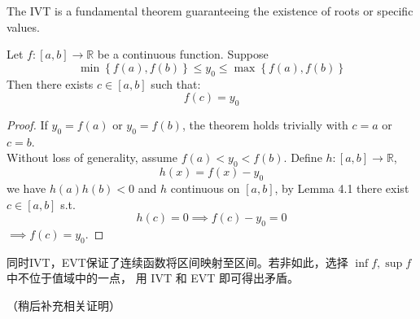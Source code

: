 \documentclass[
	UTF-8,
	11pt, %
	a4paper, %
]{LegrandOrangeBook}
\begin{document}
    The IVT is a fundamental theorem guaranteeing the existence of roots or specific values.

    \begin{theorem}
    Let $f: [a, b] \to \mathbb{R}$ be a continuous function. Suppose
     $$
        \min\left\{f(a), f(b)\right\} \leq y_0 \leq \max\left\{f(a), f(b)\right\}
     $$
     Then there exists $c \in [a, b]$ such that:
    \[ f(c) = y_0 \]
    \end{theorem}

    \begin{proof}
        If $y_0 = f(a)$ or $y_0 = f(b)$, the theorem holds trivially with $c=a$ or $c=b$.\\

        Without loss of generality, assume $f(a) < y_0 < f(b)$. Define $h: [a, b] \to \mathbb{R}$,
        $$
            h(x) = f(x)-y_0
        $$
        we have $h(a)h(b) < 0$ and $h$ continuous on $[a,b]$, by Lemma 4.1 there exist $c \in [a,b]$ s.t.
        $$
            h(c) = 0 \implies f(c)-y_0 = 0
        $$
        $\implies f(c) = y_0$.
    \end{proof}

    \begin{remark}
        同时IVT，EVT保证了连续函数将区间映射至区间。若非如此，选择 $\inf f , \sup f$ 中不位于值域中的一点，
        用 IVT 和 EVT 即可得出矛盾。
    \end{remark}
    （稍后补充相关证明）



\end{document}
